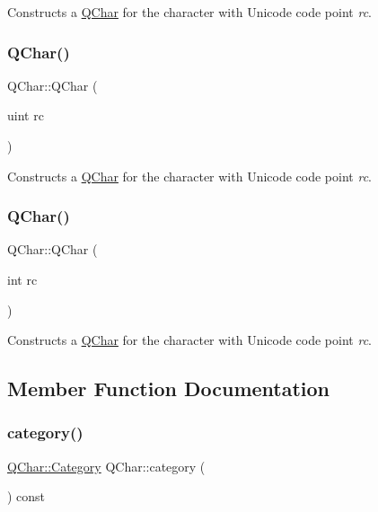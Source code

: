 Constructs a \mbox{\hyperlink{class_q_char}{Q\+Char}} for the character with Unicode code point {\itshape rc}. \mbox{\label{class_q_char_ab508e623fe37bdcd7d855539baaf846c}} 
\subsubsection{\texorpdfstring{QChar()}{QChar()}\hspace{0.1cm}{\footnotesize\ttfamily [8/9]}}
{\footnotesize\ttfamily Q\+Char\+::\+Q\+Char (\begin{DoxyParamCaption}\item[{uint}]{rc }\end{DoxyParamCaption})\hspace{0.3cm}{\ttfamily [inline]}}

Constructs a \mbox{\hyperlink{class_q_char}{Q\+Char}} for the character with Unicode code point {\itshape rc}. \mbox{\label{class_q_char_aa16b5930b815ea41ab29112fe3d7a378}} 
\subsubsection{\texorpdfstring{QChar()}{QChar()}\hspace{0.1cm}{\footnotesize\ttfamily [9/9]}}
{\footnotesize\ttfamily Q\+Char\+::\+Q\+Char (\begin{DoxyParamCaption}\item[{int}]{rc }\end{DoxyParamCaption})\hspace{0.3cm}{\ttfamily [inline]}}

Constructs a \mbox{\hyperlink{class_q_char}{Q\+Char}} for the character with Unicode code point {\itshape rc}. 

\subsection{Member Function Documentation}
\mbox{\label{class_q_char_a4bc1ffcdc40c674015b3bb9e9114637e}} 
\subsubsection{\texorpdfstring{category()}{category()}}
{\footnotesize\ttfamily \mbox{\hyperlink{class_q_char_a62908095db0c54f35ff2ae928c621a97}{Q\+Char\+::\+Category}} Q\+Char\+::category (\begin{DoxyParamCaption}{ }\end{DoxyParamCaption}) const}

